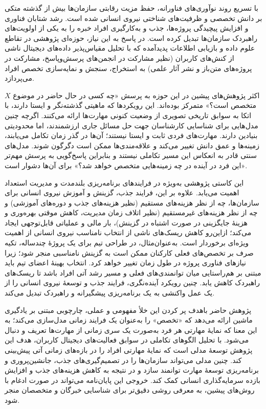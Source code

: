 

با تسریع روند نوآوری‌های فناورانه، حفظ مزیت رقابتی سازمان‌ها بیش از گذشته متکی بر دانش تخصصی و ظرفیت‌های شناختی نیروی انسانی شده است. رشد شتابان فناوری و افزایش پیچیدگی پروژه‌ها، جذب و به‌کارگیری افراد خبره را به یکی از اولویت‌های راهبردک سازمان‌ها تبدیل کرده است. در پاسخ به این نیاز، حوزه‌ای پژوهشی در تقاطع علوم داده و بازیابی اطلاعات پدیدآمده که با تحلیل مقیاس‌پذیر داده‌های دیجیتال ناشی از کنش‌های کاربران (نظیر مشارکت در انجمن‌های پرسش‌وپاسخ، مشارکت در پروژه‌های متن‌باز و نشر آثار علمی) به استخراج، سنجش و نمایه‌سازی تخصص افراد می‌پردازد\cite{articl, Mohamed_Shehata_2023}.

اکثر پژوهش‌های پیشین در این حوزه به پرسش «چه کسی در حال حاضر در موضوع \(X\) متخصص است؟» متمرکز بوده‌اند. این رویکردها که ماهیتی گذشته‌نگر و ایستا دارند، با اتکا به سوابق تاریخی تصویری از وضعیت کنونی مهارت‌ها ارائه می‌کنند. اگرچه چنین مدل‌هایی برای شناسایی کارشناسان جهت حل مسائل جاری ارزشمندند، اما محدودیتی بنیادین دارند. مهارت‌های فردی ثابت و ایستا نیستند؛ آن‌ها در گذر زمان تکامل می‌یابند، زمینه‌ها و عمق دانش تغییر می‌کند و علاقه‌مندی‌ها ممکن است دگرگون شوند. مدل‌های سنتی قادر به انعکاس این مسیر تکاملی نیستند و بنابراین پاسخ‌گویی به پرسش مهم‌تر «این فرد در آینده در چه زمینه‌هایی متخصص خواهد شد؟» برای آن‌ها دشوار است\cite{balog_expertise_2012}.


این کاستی پژوهشی به‌ویژه در فرایندهای برنامه‌ریزی بلندمدت و مدیریت استعداد اهمیت می‌یابد. علاوه بر این، فرایند جذب، گزینش و آموزش نیروی انسانی برای سازمان‌ها، چه از نظر هزینه‌های مستقیم (نظیر هزینه‌های جذب و دوره‌های آموزشی) و چه از نظر هزینه‌های غیرمستقیم (نظیر اتلاف زمان مدیریت، کاهش موقتی بهره‌وری و هزینهٔ جایگزینی در صورت اشتباه در گزینش)، بار مالی و عملیاتی قابل‌توجهی ایجاد می‌کند؛ ازاین‌رو کاهش ریسک‌های ناشی از انتخاب نامناسب نیروی انسانی از اهمیت ویژه‌ای برخوردار است. به‌عنوان‌مثال، در طراحی تیم برای یک پروژهٔ چندساله، تکیه صرف بر تخصص‌های فعلی کارکنان ممکن است به گزینش نامناسبی منجر شود؛ زیرا نیازهای فناوری پروژه در طول زمان تغییر خواهد کرد. انتخاب بهینهٔ اعضای تیم باید مبتنی بر هم‌راستایی میان توانمندی‌های فعلی و مسیر رشد آتی افراد باشد تا ریسک‌های راهبردک کاهش یابد. چنین رویکرد آینده‌نگری، فرایند جذب و توسعهٔ نیروی انسانی را از یک عمل واکنشی به یک برنامه‌ریزی پیشگیرانه و راهبردک تبدیل می‌کند.

پژوهش حاضر باهدف پر کردن این خلأ مفهومی و عملی، چارچوبی مبتنی بر یادگیری ماشین ارائه می‌دهد که «تخصص» را به‌عنوان یک فرایند زمانی مدل‌سازی می‌کند؛ به این معنا که نمایهٔ مهارتی هر فرد به‌صورت یک سری زمانی از مهارت‌ها تعریف و دنبال می‌شود. با تحلیل الگوهای تکاملی در سوابق فعالیت‌های دیجیتال کاربران، هدف این پژوهش توسعهٔ مدلی است که نمایهٔ مهارتی افراد را در بازه‌های زمانی آتی پیش‌بینی کند. چنین مدلی می‌تواند سازمان‌ها را در تصمیم‌گیری‌های جذب، جانشین‌پروری و برنامه‌ریزی توسعهٔ مهارت توانمند سازد و در نتیجه به کاهش هزینه‌های جذب و افزایش بازده سرمایه‌گذاری انسانی کمک کند. خروجی این پایان‌نامه می‌تواند در صورت ادغام با روش‌های پیشین، به معرفی روشی دقیق‌تر برای شناسایی خبرگان و متخصصان منجر شود.

